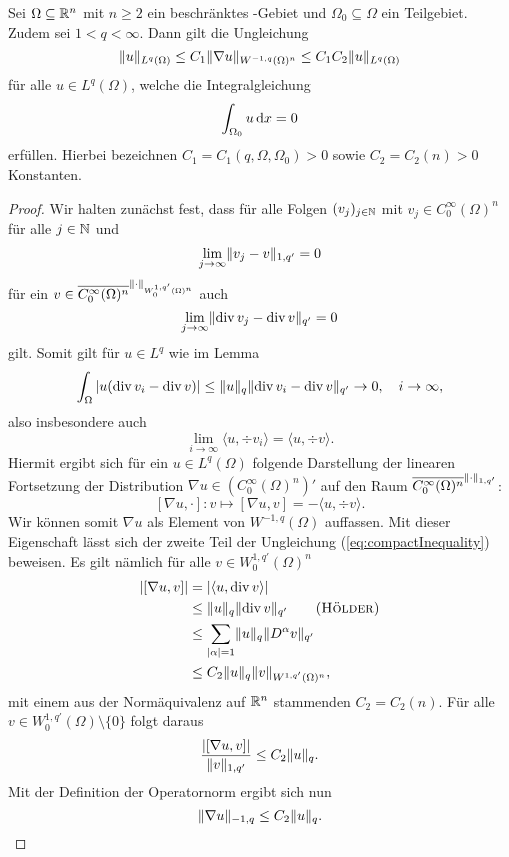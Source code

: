 \begin{lem}
  \label{lem:compactEmbedding}
  Sei $\Omega \subseteq \mathbb{R}^n$ mit $n \geq 2$ ein beschränktes \lipschitz\hyp{}Gebiet und $\Omega_0 \subseteq \Omega$ ein Teilgebiet.
  Zudem sei $1 < q < \infty$.
  Dann gilt die Ungleichung
  \begin{equation}
    \label{eq:compactInequality}
    \lVert u \rVert_{L^q(\Omega)} 
    \leq C_1 \lVert \nabla u \rVert_{W^{-1,q}(\Omega)^n}
    \leq C_1 C_2 \lVert u \rVert_{L^q(\Omega)}
  \end{equation}
  für alle $u \in L^q(\Omega)$, welche die Integralgleichung
  $$
  \int_{\Omega_0} u \, {\operatorname{d}\!{x}} = 0
  $$
  erfüllen.
  Hierbei bezeichnen $C_1 = C_1(q, \Omega, \Omega_0) > 0$ sowie $C_2 = C_2(n) > 0$ Konstanten.
\end{lem}

\begin{proof}
  Wir halten zunächst fest, dass für alle Folgen $(v_j)_{j \in \mathbb{N}}$ mit $v_j \in C_0^\infty(\Omega)^n$ für alle $j \in \mathbb{N}$ und 
  $$
  \lim_{j \to \infty} \lVert v_j - v \rVert_{1,q'} = 0
  $$ 
  für ein $v \in \overline{C_0^\infty(\Omega)^n}^{\lVert \cdot \rVert_{W_0^{1,q'}(\Omega)^n}}$ auch 
  $$
  \lim_{j \to \infty} \lVert \mathrm{div\,} v_j - \mathrm{div\,} v \rVert_{q'} = 0
  $$ 
  gilt.
  Somit gilt für $u \in L^q$ wie im Lemma
  $$
  \int_\Omega | u ( \mathrm{div\,} v_i - \mathrm{div\,} v) | \leq \lVert u \rVert_q \lVert \mathrm{div\,} v_i - \mathrm{div\,} v \rVert_{q'} \to 0, \quad i \to \infty,
  $$
  also insbesondere auch
  $$
  \lim_{i \to \infty} \langle u, \div v_i \rangle = \langle u, \div v \rangle.
  $$
  Hiermit ergibt sich für ein $u \in L^q(\Omega)$ folgende Darstellung der linearen Fortsetzung der Distribution $\nabla u \in (C_0^\infty(\Omega)^n)'$ auf den Raum $\overline{C_0^\infty(\Omega)^n}^{\lVert \cdot \rVert_{1,q'}}$:
  $$
    [\nabla u, \cdot] \colon v \mapsto [\nabla u, v] 
    = - \langle u, \div v \rangle.
  $$
  Wir können somit $\nabla u$ als Element von $W^{-1,q}(\Omega)$ auffassen.
  Mit dieser Eigenschaft lässt sich der zweite Teil der Ungleichung (\ref{eq:compactInequality}) beweisen. 
  Es gilt nämlich für alle $v \in W_0^{1,q'}(\Omega)^n$
  \begin{align*}
    |[\nabla u, v]|
    &= | \langle u, \div v \rangle| \\
    &\leq \norm{u}_q \norm{\div v}_{q'} \tag{\hoelder}\\
    &\leq \sum_{|\alpha| = 1} \norm{u}_q \norm{D^\alpha v}_{q'} \\
    &\leq C_2 \norm{u}_q \norm{v}_{W^{1,q'}(\Omega)^n},
  \end{align*}
  mit einem aus der Normäquivalenz auf $\mathbb{R}^n$ stammenden $C_2 = C_2(n)$.
  Für alle $v \in W_0^{1,q'}(\Omega) \setminus\{0\}$ folgt daraus
  $$
  \frac{|[\nabla u, v]|}{\lVert v \rVert_{1,q'}} \leq C_2 \lVert u \rVert_q.
  $$
  Mit der Definition der Operatornorm ergibt sich nun
  $$
  \lVert \nabla u \rVert_{-1,q} \leq C_2\lVert u \rVert_q.
  $$


\end{proof}
